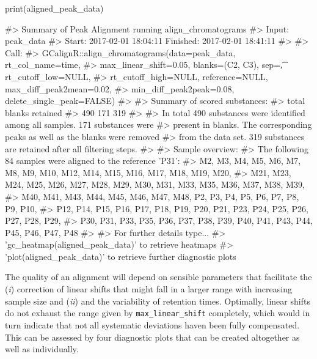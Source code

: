 \begin{Schunk}
\begin{Sinput}
print(aligned_peak_data)
\end{Sinput}
\begin{Soutput}
#> Summary of Peak Alignment running align_chromatograms
#> Input: peak_data
#> Start:  2017-02-01 18:04:11  Finished:  2017-02-01 18:41:11 
#> 
#> Call:
#>   GCalignR::align_chromatograms(data=peak_data, rt_col_name=time,
#>   max_linear_shift=0.05, blanks=(C2, C3), sep=\t, rt_cutoff_low=NULL,
#>   rt_cutoff_high=NULL, reference=NULL, max_diff_peak2mean=0.02,
#>   min_diff_peak2peak=0.08, delete_single_peak=FALSE)
#> 
#> Summary of scored substances:
#>    total   blanks retained 
#>      490      171      319 
#> 
#> In total 490 substances were identified among all samples. 171 substances were
#>   present in blanks. The corresponding peaks as well as the blanks were removed
#>   from the data set. 319 substances are retained after all filtering steps.
#> 
#> Sample overview:
#>   The following 84 samples were aligned to the reference 'P31':
#>   M2, M3, M4, M5, M6, M7, M8, M9, M10, M12, M14, M15, M16, M17, M18, M19, M20,
#>   M21, M23, M24, M25, M26, M27, M28, M29, M30, M31, M33, M35, M36, M37, M38, M39,
#>   M40, M41, M43, M44, M45, M46, M47, M48, P2, P3, P4, P5, P6, P7, P8, P9, P10,
#>   P12, P14, P15, P16, P17, P18, P19, P20, P21, P23, P24, P25, P26, P27, P28, P29,
#>   P30, P31, P33, P35, P36, P37, P38, P39, P40, P41, P43, P44, P45, P46, P47, P48
#> 
#> For further details type...
#>   'gc_heatmap(aligned_peak_data)' to retrieve heatmaps
#>   'plot(aligned_peak_data)' to retrieve further diagnostic plots
\end{Soutput}
\end{Schunk}

The quality of an alignment will depend on sensible parameters that
facilitate the (\emph{i}) correction of linear shifts that might fall in
a larger range with increasing sample size and (\emph{ii}) and the
variability of retention times. Optimally, linear shifts do not exhaust
the range given by \texttt{max\_linear\_shift} completely, which would
in turn indicate that not all systematic deviations haven been fully
compensated. This can be assessed by four diagnostic plots that can be
created altogether as well as individually.

